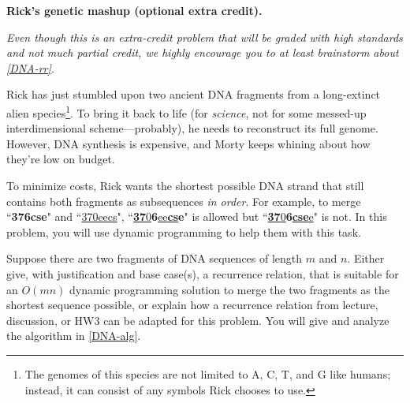 \documentclass[11pt,addpoints,answers]{exam}
\begin{document}
\begin{questions}
\pagebreak
\ifprintanswers
\else
\newpage
\fi

    \bonusquestion \textbf{Rick's genetic mashup (optional extra credit).}

  \emph{Even though this is an extra-credit problem that will be graded with high standards and not much partial credit, we highly encourage you to at least brainstorm about \cref{DNA-rr}.}

    Rick has just stumbled upon two ancient DNA fragments from a long-extinct alien species\footnote{The genomes of this species are not limited to A, C, T, and G like humans; instead, it can consist of any symbols Rick chooses to use.}. To bring it back to life (for \emph{science}, not for some messed-up interdimensional scheme—probably), he needs to reconstruct its full genome. However, DNA synthesis is expensive, and Morty keeps whining about how they’re low on budget.

    To minimize costs, Rick wants the shortest possible DNA strand that still contains both fragments as subsequences \emph{in order}. For example, to merge ``\textbf{376cse}" and ``\underline{370eecs}",  ``\underline{\textbf{37}0}\textbf{6}\underline{ee\textbf{cs}}\textbf{e}" is allowed but ``\underline{\textbf{37}0}\textbf{6}\underline{\textbf{cse}e}" is not. In this problem, you will use dynamic programming to help them with this task. 

    \begin{parts}

        \bonuspart [2] Suppose there are two fragments of DNA sequences of length $m$ and $n$. Either give, with justification and base case(s), a recurrence relation, that is suitable for an $O(mn)$ dynamic programming solution to merge the two fragments as the shortest sequence possible, or explain how a recurrence relation from lecture, discussion, or HW3 can be adapted for this problem. You will give and analyze the algorithm in \cref{DNA-alg}. \label{DNA-rr}


\end{parts}
\end{questions}
\end{document}
